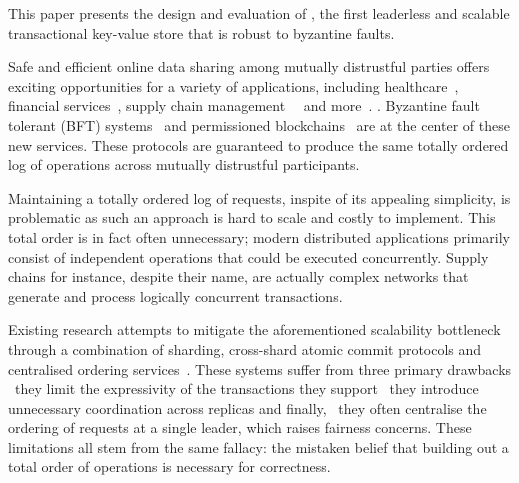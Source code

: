 This paper presents the design and evaluation of \sys{}, the
first leaderless and scalable transactional key-value store that is robust to byzantine faults.

Safe and efficient online data sharing among mutually distrustful
parties offers exciting opportunities for a variety of applications,
including healthcare~\cite{}, financial services~\cite{}, supply chain
management~~\cite{} and more~\cite{}. . Byzantine fault tolerant (BFT)
systems~\cite{castro1999practical,martin2006fast,kotla2007zyzzyva,  gueta2018sbft,clement2009making,buchman2016tendermint,yin2019hotstuff,Clement09Upright,duan2014hbft, pires2018generalized,bessani2014state,lamport2011byzantizing,arun2019ezbft, malkhi2019flexible,duan2014hbft,yin2003separating, Guerraoui08Next, Kotla04High,liskov2010viewstamped} and permissioned blockchains~\cite{Hyperledger,EthereumQuorum, buchman2016tendermint, al2017chainspace,kokoris2018omniledger,gilad2017algorand, baudet2019state} are at the center of these new services. These protocols are guaranteed to
produce the same totally ordered log of operations across mutually distrustful
participants. 

Maintaining a totally ordered log of requests, inspite of its appealing simplicity, is problematic as such an approach is hard to scale and costly to implement. This total order is in fact often unnecessary; modern distributed applications primarily consist of independent operations that could be executed concurrently. Supply chains for instance, despite their name, are actually complex networks that generate and process logically concurrent transactions.

Existing research attempts to mitigate the aforementioned scalability bottleneck through a combination of sharding, cross-shard atomic commit protocols and centralised ordering services~\cite{kokoris2018omniledger,al2017chainspace,padilha2016callinicos}. These systems suffer from three primary drawbacks \one~they limit the expressivity of the transactions they support \two~they introduce unnecessary coordination across replicas and finally,
\three~they often centralise the ordering of requests at a single leader, which raises fairness concerns. These limitations all stem from the same fallacy: the mistaken belief that building out a total order of operations is necessary for correctness.
 
